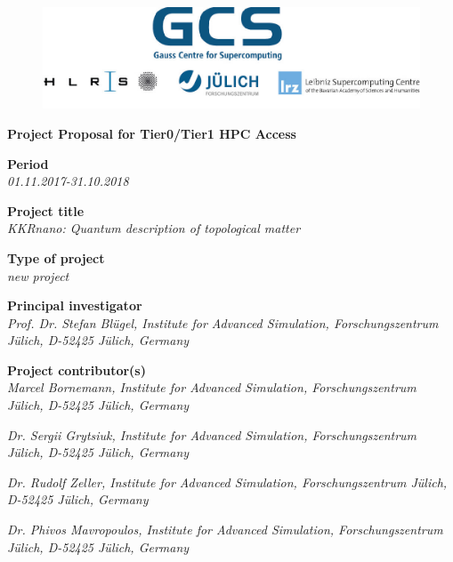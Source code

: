 \documentclass [a4paper, 12pt]{article}
\begin{document}
 
\begin{figure}[H]
\begin{center}
  \includegraphics[scale=0.45]{Figures/GCS-hlrs-fzj-lrz.jpg}\\
\end{center}
\end{figure}

\begin{center}
{\LARGE \bf Project Proposal for Tier0/Tier1 HPC Access} \\

\bigskip
\bigskip
\bigskip
\end{center}
\textbf{Period}\\
\phantom{MM}\textit{01.11.2017-31.10.2018}

\bigskip
\textbf{Project title}\\
\phantom{MM}\textit{KKRnano: Quantum description of topological matter}

\bigskip
\textbf{Type of project}\\
\phantom{MM} \textit{new project}


\bigskip
\textbf{Principal investigator}\\
\phantom{MM} \textit{ Prof. Dr. Stefan Bl{\"u}gel,
Institute for Advanced Simulation, Forschungszentrum J\"ulich, D-52425 J\"ulich, Germany
}

\bigskip
\textbf{Project contributor(s)}\\

\phantom{MM} \textit{Marcel Bornemann,
Institute for Advanced Simulation, Forschungszentrum J\"ulich, D-52425 J\"ulich, Germany
}

\phantom{MM} \textit{Dr. Sergii Grytsiuk,
Institute for Advanced Simulation, Forschungszentrum J\"ulich, D-52425 J\"ulich, Germany
}

\phantom{MM} \textit{Dr. Rudolf Zeller,
Institute for Advanced Simulation, Forschungszentrum J\"ulich, D-52425 J\"ulich, Germany
}

\phantom{MM} \textit{Dr. Phivos Mavropoulos,
Institute for Advanced Simulation, Forschungszentrum J\"ulich, D-52425 J\"ulich, Germany
}
\end{document}
